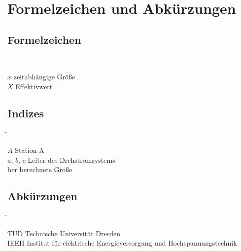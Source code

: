 \section*{Formelzeichen und Abkürzungen}

\subsection*{Formelzeichen}
\begin{tabbing}
\hspace{3cm} \= \kill

$x$ \> zeitabhängige Größe \\
$X$ \> Effektivwert \\

\end{tabbing}


\newpage
\subsection*{Indizes}
\begin{tabbing}
\hspace{3cm} \= \kill

$A$ \> Station A \\
$a,\,b,\,c$ \> Leiter des Drehstromsystems \\
ber \> berechnete Größe \\

\end{tabbing}


\subsection*{Abkürzungen}
\begin{tabbing}
\hspace{3cm} \= \kill

TUD \> Technische Universität Dresden \\
IEEH \> Institut für elektrische Energieversorgung und Hochspannungstechnik \\

\end{tabbing}